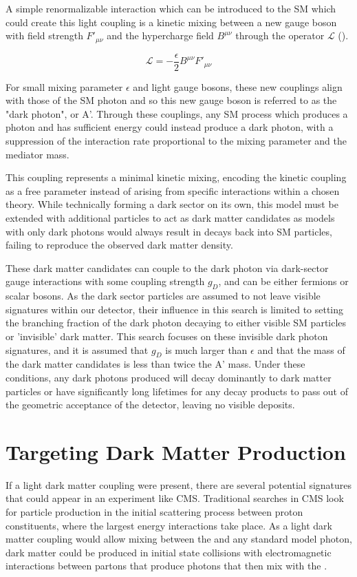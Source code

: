 A simple renormalizable interaction which can be introduced to the SM which could create this light coupling is a kinetic mixing between a new gauge boson with field strength $F'_{\mu\nu}$ and the hypercharge field $B^{\mu\nu}$ through the operator $\mathcal{L}$ (). 

\begin{equation}
	\label{eq:LDMlagrangian}
	\mathcal{L} = - \frac{\epsilon}{2} B^{\mu\nu}F'_{\mu\nu}
\end{equation}

For small mixing parameter $\epsilon$ and light gauge bosons, these new couplings align with those of the SM photon \cite{Bauer_2018} and so this new gauge boson is referred to as the "dark photon", or A'.
Through these couplings, any SM process which produces a photon and has sufficient energy could instead produce a dark photon, with a suppression of the interaction rate proportional to the mixing parameter and the mediator mass.

This coupling represents a minimal kinetic mixing, encoding the kinetic coupling as a free parameter instead of arising from specific interactions within a chosen theory. 
While technically forming a dark sector on its own, this model must be extended with additional particles to act as dark matter candidates as models with only dark photons would always result in decays back into SM particles, failing to reproduce the observed dark matter density.

These dark matter candidates can couple to the dark photon via dark-sector gauge interactions with some coupling strength $g_D$, and can be either fermions or scalar bosons.
As the dark sector particles are assumed to not leave visible signatures within our detector, their influence in this search is limited to setting the branching fraction of the dark photon decaying to either visible SM particles or 'invisible' dark matter.
This search focuses on these invisible dark photon signatures, and it is assumed that $g_D$ is much larger than $\epsilon$ and that the mass of the dark matter candidates is less than twice the A' mass.
Under these conditions, any dark photons produced will decay dominantly to dark matter particles or have significantly long lifetimes for any decay products to pass out of the geometric acceptance of the detector, leaving no visible deposits.

\section{Targeting Dark Matter Production}
If a light dark matter coupling were present, there are several potential signatures that could appear in an experiment like CMS.
Traditional searches in CMS look for particle production in the initial scattering process between proton constituents, where the largest energy interactions take place.
As a light dark matter coupling would allow mixing between the \aprime and any standard model photon, dark matter could be produced in initial state collisions with electromagnetic interactions between partons that produce photons that then mix with the \aprime.

